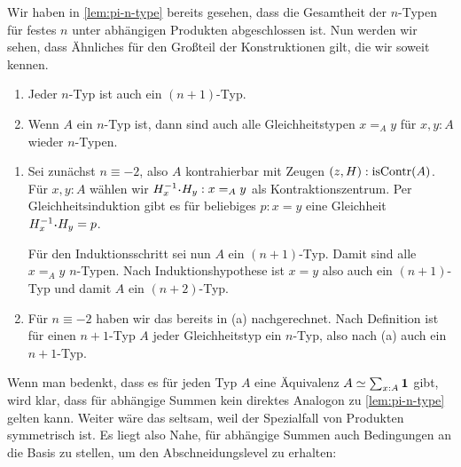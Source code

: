 Wir haben in \cref{lem:pi-n-type} bereits gesehen, dass die Gesamtheit der $n$-Typen für festes $n$ unter abhängigen Produkten abgeschlossen ist.
Nun werden wir sehen, dass Ähnliches für den Großteil der Konstruktionen gilt, die wir soweit kennen.

\begin{bemerkung}
  \label{bem:n-type-cumulative}
  \begin{enumerate}
  \item Jeder $n$-Typ ist auch ein $(n+1)$-Typ.
  \item Wenn $A$ ein $n$-Typ ist, dann sind auch alle Gleichheitstypen $x=_A y$ für $x,y:A$ wieder $n$-Typen.
  \end{enumerate}
\end{bemerkung}
\begin{beweis}
  \begin{enumerate}
  \item Sei zunächst $n\equiv -2$, also $A$ kontrahierbar mit Zeugen $(z,H):\mathrm{isContr}(A)$.
    Für $x,y:A$ wählen wir $H^{-1}_x\kon H_y: x=_A y$ als Kontraktionszentrum.
    Per Gleichheitsinduktion gibt es für beliebiges $p:x=y$ eine Gleichheit $H_x^{-1}\kon H_y=p$.

    Für den Induktionsschritt sei nun $A$ ein $(n+1)$-Typ.
    Damit sind alle $x=_A y$ $n$-Typen. Nach Induktionshypothese ist $x=y$ also auch ein $(n+1)$-Typ und damit $A$ ein $(n+2)$-Typ.
  \item Für $n\equiv -2$ haben wir das bereits in (a) nachgerechnet.
    Nach Definition ist für einen $n+1$-Typ $A$ jeder Gleichheitstyp ein $n$-Typ, also nach (a) auch ein $n+1$-Typ.
  \end{enumerate}
\end{beweis}

Wenn man bedenkt, dass es für jeden Typ $A$ eine Äquivalenz $A\simeq \sum_{x:A}\mathbf{1}$ gibt, wird klar, dass für abhängige Summen
kein direktes Analogon zu \cref{lem:pi-n-type} gelten kann. Weiter wäre das seltsam, weil der Spezialfall von Produkten symmetrisch ist.
Es liegt also Nahe, für abhängige Summen auch Bedingungen an die Basis zu stellen, um den Abschneidungslevel zu erhalten:

